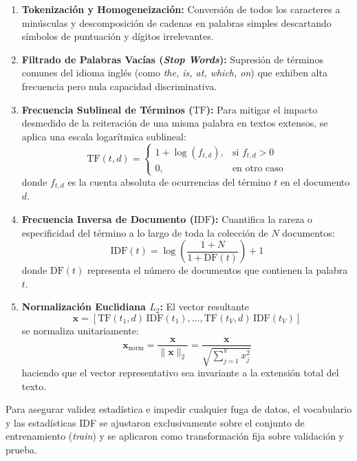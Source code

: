 \documentclass[12pt, a4paper]{article}
\begin{document}
\begin{enumerate}
    \item \textbf{Tokenización y Homogeneización:} Conversión de todos los caracteres a minúsculas y descomposición de cadenas en palabras simples descartando símbolos de puntuación y dígitos irrelevantes.
    \item \textbf{Filtrado de Palabras Vacías (\textit{Stop Words}):} Supresión de términos comunes del idioma inglés (como \textit{the, is, at, which, on}) que exhiben alta frecuencia pero nula capacidad discriminativa.
    \item \textbf{Frecuencia Sublineal de Términos ($\text{TF}$):} Para mitigar el impacto desmedido de la reiteración de una misma palabra en textos extensos, se aplica una escala logarítmica sublineal:
    \begin{equation}
        \text{TF}(t, d) = 
        \begin{cases} 
            1 + \log(f_{t,d}), & \text{si } f_{t,d} > 0 \\ 
            0, & \text{en otro caso} 
        \end{cases}
    \end{equation}
    donde $f_{t,d}$ es la cuenta absoluta de ocurrencias del término $t$ en el documento $d$.
    \item \textbf{Frecuencia Inversa de Documento ($\text{IDF}$):} Cuantifica la rareza o especificidad del término a lo largo de toda la colección de $N$ documentos:
    \begin{equation}
        \text{IDF}(t) = \log\left( \frac{1 + N}{1 + \text{DF}(t)} \right) + 1
    \end{equation}
    donde $\text{DF}(t)$ representa el número de documentos que contienen la palabra $t$.
    \item \textbf{Normalización Euclidiana $L_2$:} El vector resultante
    \[
        \mathbf{x} = [\text{TF}(t_1,d)\,\text{IDF}(t_1), \dots, \text{TF}(t_V,d)\,\text{IDF}(t_V)]
    \]
    se normaliza unitariamente:
    \begin{equation}
        \mathbf{x}_{\text{norm}} = \frac{\mathbf{x}}{\|\mathbf{x}\|_2} = \frac{\mathbf{x}}{\sqrt{\sum_{j=1}^V x_j^2}}
    \end{equation}
    haciendo que el vector representativo sea invariante a la extensión total del texto.
\end{enumerate}

Para asegurar validez estadística e impedir cualquier fuga de datos, el vocabulario y las estadísticas IDF se ajustaron exclusivamente sobre el conjunto de entrenamiento (\textit{train}) y se aplicaron como transformación fija sobre validación y prueba.
\end{document}
